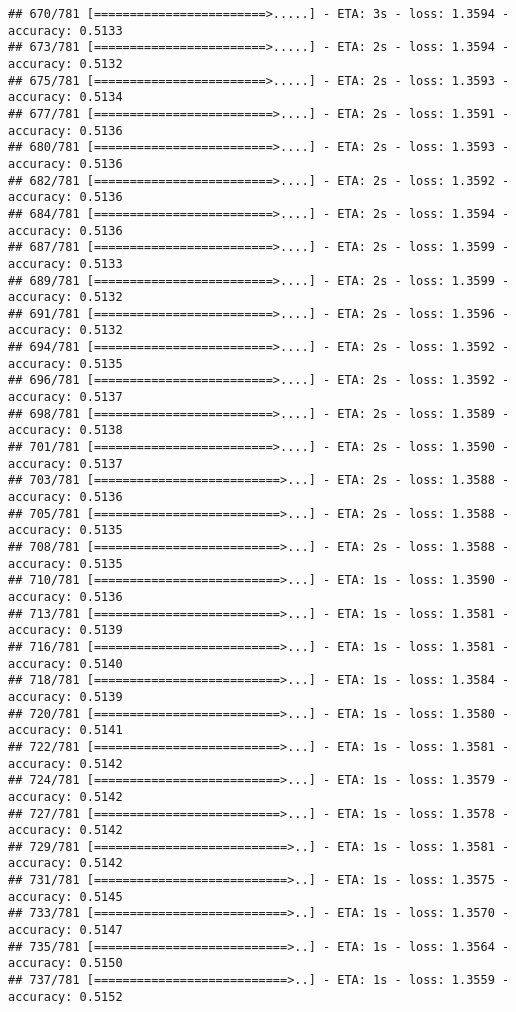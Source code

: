 \documentclass[
]{article}
\begin{document}
\begin{verbatim}
## 670/781 [========================>.....] - ETA: 3s - loss: 1.3594 - accuracy: 0.5133
## 673/781 [========================>.....] - ETA: 2s - loss: 1.3594 - accuracy: 0.5132
## 675/781 [========================>.....] - ETA: 2s - loss: 1.3593 - accuracy: 0.5134
## 677/781 [=========================>....] - ETA: 2s - loss: 1.3591 - accuracy: 0.5136
## 680/781 [=========================>....] - ETA: 2s - loss: 1.3593 - accuracy: 0.5136
## 682/781 [=========================>....] - ETA: 2s - loss: 1.3592 - accuracy: 0.5136
## 684/781 [=========================>....] - ETA: 2s - loss: 1.3594 - accuracy: 0.5136
## 687/781 [=========================>....] - ETA: 2s - loss: 1.3599 - accuracy: 0.5133
## 689/781 [=========================>....] - ETA: 2s - loss: 1.3599 - accuracy: 0.5132
## 691/781 [=========================>....] - ETA: 2s - loss: 1.3596 - accuracy: 0.5132
## 694/781 [=========================>....] - ETA: 2s - loss: 1.3592 - accuracy: 0.5135
## 696/781 [=========================>....] - ETA: 2s - loss: 1.3592 - accuracy: 0.5137
## 698/781 [=========================>....] - ETA: 2s - loss: 1.3589 - accuracy: 0.5138
## 701/781 [=========================>....] - ETA: 2s - loss: 1.3590 - accuracy: 0.5137
## 703/781 [==========================>...] - ETA: 2s - loss: 1.3588 - accuracy: 0.5136
## 705/781 [==========================>...] - ETA: 2s - loss: 1.3588 - accuracy: 0.5135
## 708/781 [==========================>...] - ETA: 2s - loss: 1.3588 - accuracy: 0.5135
## 710/781 [==========================>...] - ETA: 1s - loss: 1.3590 - accuracy: 0.5136
## 713/781 [==========================>...] - ETA: 1s - loss: 1.3581 - accuracy: 0.5139
## 716/781 [==========================>...] - ETA: 1s - loss: 1.3581 - accuracy: 0.5140
## 718/781 [==========================>...] - ETA: 1s - loss: 1.3584 - accuracy: 0.5139
## 720/781 [==========================>...] - ETA: 1s - loss: 1.3580 - accuracy: 0.5141
## 722/781 [==========================>...] - ETA: 1s - loss: 1.3581 - accuracy: 0.5142
## 724/781 [==========================>...] - ETA: 1s - loss: 1.3579 - accuracy: 0.5142
## 727/781 [==========================>...] - ETA: 1s - loss: 1.3578 - accuracy: 0.5142
## 729/781 [===========================>..] - ETA: 1s - loss: 1.3581 - accuracy: 0.5142
## 731/781 [===========================>..] - ETA: 1s - loss: 1.3575 - accuracy: 0.5145
## 733/781 [===========================>..] - ETA: 1s - loss: 1.3570 - accuracy: 0.5147
## 735/781 [===========================>..] - ETA: 1s - loss: 1.3564 - accuracy: 0.5150
## 737/781 [===========================>..] - ETA: 1s - loss: 1.3559 - accuracy: 0.5152

\end{verbatim}
\end{document}
